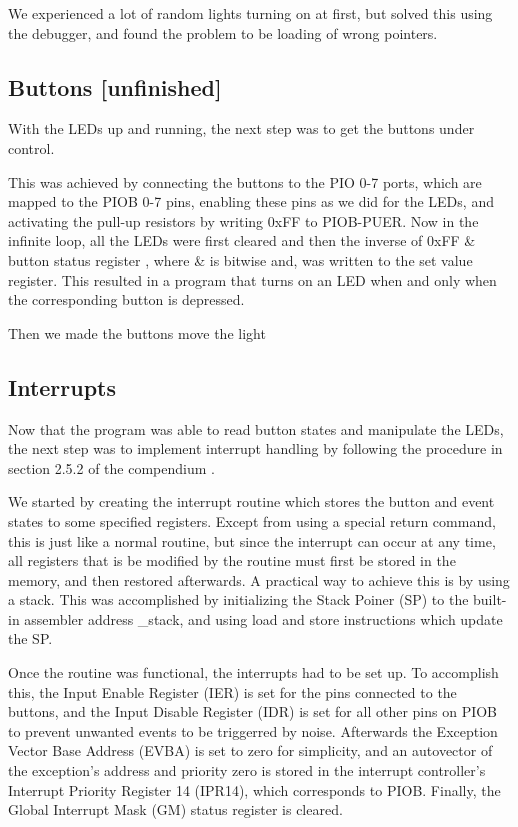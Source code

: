 We experienced a lot of random lights turning on at first, but solved this using the debugger, and found the problem to be loading of wrong pointers.
\subsection{Buttons [unfinished]}

With the LEDs up and running, the next step was to get the buttons under control.

This was achieved by connecting the buttons to the PIO 0-7 ports, which are mapped to the PIOB 0-7 pins, enabling these pins as we did for the LEDs, and activating the pull-up resistors by writing 0xFF to PIOB-PUER. Now in the infinite loop, all the LEDs were first cleared and then the inverse of 0xFF \& {button status register} , where \& is bitwise and, was written to the {set value register}. This resulted in a program that turns on an LED when and only when the corresponding button is depressed.

Then we made the buttons move the light
\subsection{Interrupts}

Now that the program was able to read button states and manipulate the LEDs, the next step was to implement interrupt handling by following the procedure in section 2.5.2 of the compendium \cite{compendium}.

We started by creating the interrupt routine which stores the button and event states to some specified registers. Except from using a special return command, this is just like a normal routine, but since the interrupt can occur at any time, all registers that is be modified by the routine must first be stored in the memory, and then restored afterwards. A practical way to achieve this is by using a stack. This was accomplished by initializing the Stack Poiner (SP) to the built-in assembler address \_stack, and using load and store instructions which update the SP.

Once the routine was functional, the interrupts had to be set up. To accomplish this, the Input Enable Register (IER) is set for the pins connected to the buttons, and the Input Disable Register (IDR) is set for all other pins on PIOB to prevent unwanted events to be triggerred by noise. Afterwards the Exception Vector Base Address (EVBA) is set to zero for simplicity, and an autovector of the exception’s address and priority zero is stored in the interrupt controller’s Interrupt Priority Register 14 (IPR14), which corresponds to PIOB. Finally, the Global Interrupt Mask (GM) status register is cleared.

